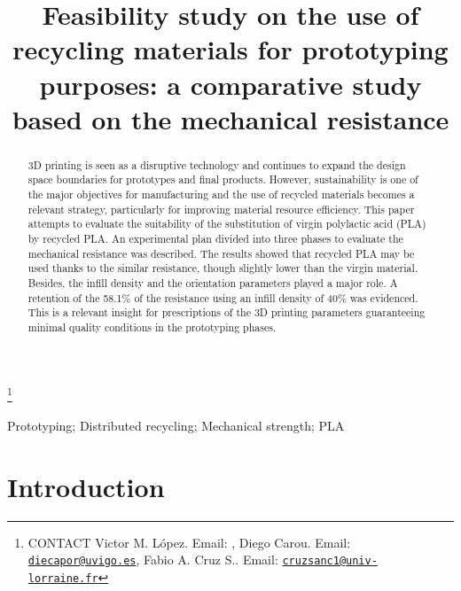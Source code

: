 \documentclass[]{interact}
\theoremstyle{plain}%
\theoremstyle{definition}
\theoremstyle{remark}
\begin{document}

\title{Feasibility study on the use of recycling materials for
prototyping purposes: a comparative study based on the mechanical
resistance}


\author{
}

\thanks{CONTACT Victor M. López. Email: , Diego
Carou. Email: \href{mailto:diecapor@uvigo.es}{\nolinkurl{diecapor@uvigo.es}}, Fabio
A. Cruz
S.. Email: \href{mailto:cruzsanc1@univ-lorraine.fr}{\nolinkurl{cruzsanc1@univ-lorraine.fr}}}

\maketitle

\begin{abstract}
3D printing is seen as a disruptive technology and continues to expand
the design space boundaries for prototypes and final products. However,
sustainability is one of the major objectives for manufacturing and the
use of recycled materials becomes a relevant strategy, particularly for
improving material resource efficiency. This paper attempts to evaluate
the suitability of the substitution of virgin polylactic acid (PLA) by
recycled PLA. An experimental plan divided into three phases to evaluate
the mechanical resistance was described. The results showed that
recycled PLA may be used thanks to the similar resistance, though
slightly lower than the virgin material. Besides, the infill density and
the orientation parameters played a major role. A retention of the
58.1\% of the resistance using an infill density of 40\% was evidenced.
This is a relevant insight for prescriptions of the 3D printing
parameters guaranteeing minimal quality conditions in the prototyping
phases.
\end{abstract}

\begin{keywords}
Prototyping; Distributed recycling; Mechanical strength; PLA
\end{keywords}

\hypertarget{introduction}{%
\section{Introduction}\label{introduction}}
\end{document}
